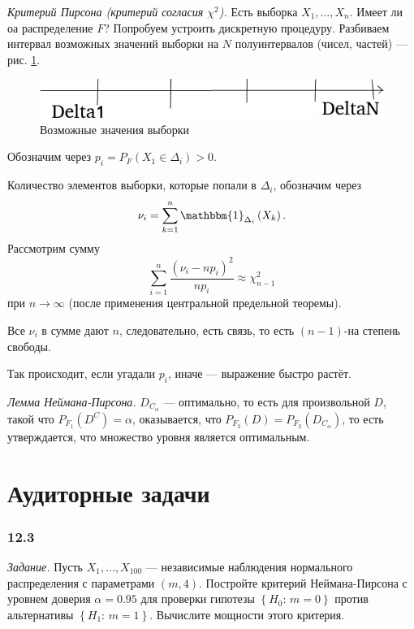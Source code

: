 \textit{Критерий Пирсона (критерий согласия $ \chi^2$).} Есть выборка $X_1, \dotsc, X_n$.
Имеет ли оа распределение $F$?
Попробуем устроить дискретную процедуру.
Разбиваем интервал возможных значений выборки на $N$ полуинтервалов (чисел, частей) ---
рис. \ref{fig:12}.

\begin{figure}[h!]
  \centering
  \includegraphics[width=.4\textwidth]{./pictures/12.png}
  \caption{Возможные значения выборки}
  \label{fig:12}
\end{figure}

Обозначим через $p_i = P_F \left( X_1 \in \Delta_i \right) > 0$.

Количество элементов выборки, которые попали в $ \Delta_i$, обозначим через
$$ \nu_i =
  \sum \limits_{k = 1}^n \mathbbm{1}_{ \Delta_i} \left( X_k \right).$$
Рассмотрим сумму
$$ \sum \limits_{i = 1}^n \frac{ \left( \nu_i - np_i \right)^2}{np_i} \approx
  \chi_{n - 1}^2$$
при $n \to \infty $ (после применения центральной предельной теоремы).

Все $ \nu_i$ в сумме дают $n$, следовательно, есть связь,
то есть $ \left( n - 1 \right) $-на степень свободы.

Так происходит, если угадали $p_i$, иначе --- выражение быстро растёт.

\textit{Лемма Неймана-Пирсона.}
$D_{C_{ \alpha }}$ --- оптимально, то есть для произвольной $D$,
такой что $P_{F_1} \left( D^C \right) = \alpha $, оказывается,
что $P_{F_2} \left( D \right) = P_{F_2} \left( D_{C_{ \alpha }} \right) $, то есть утверждается,
что множество уровня является оптимальным.

\section*{Аудиторные задачи}

\subsubsection*{12.3}

\textit{Задание.}
Пусть $X_1, \dotsc, X_{100}$ ---
независимые наблюдения нормального распределения с параметрами $ \left(m, 4 \right) $.
Постройте критерий Неймана-Пирсона с уровнем доверия $ \alpha = 0.95$ для проверки гипотезы
$ \left\{ H_0: \, m = 0 \right\} $ против альтернативы $ \left\{ H_1: \, m = 1 \right\} $.
Вычислите мощности этого критерия.

